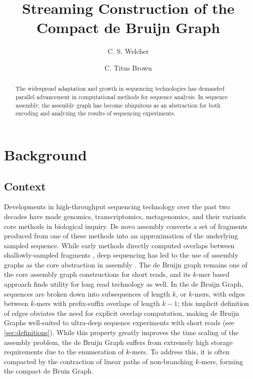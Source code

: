 \documentclass[preprint,number,12pt]{elsarticle}
\begin{document}
\begin{frontmatter}
\title{Streaming Construction of the Compact de Bruijn Graph}

\author[ggcs]{C. S. Welcher}

\author[pop,ggcs]{C. Titus Brown}

\address[ggcs]{Graduate Group for Computer Science, University of California, Davis}
\address[pop]{Department of Population Health and Reproduction, School of Veterinary Medicine, University of California, Davis}

\begin{abstract}
The widespread adaptation and growth in sequencing technologies has demanded parallel advancement in  computational methods for sequence analysis. In sequence assembly, the assembly graph has become ubiquitous as an abstraction for both encoding and analyzing the results of sequencing experiments.
\end{abstract}

\end{frontmatter}


\linenumbers
\section{Background}

\subsection{Context}\label{sec:context}

Developments in high-throughput sequencing technology over the past two decades have made genomics, transcriptomics, metagenomics, and their variants core methods in biological inquiry.
De novo assembly converts a set of fragments produced from one of these methods into an approximation of the underlying sampled sequence.
While early methods directly computed overlaps between shallowly-sampled fragments \cite{roach_random_1995}, deep sequencing has led to the use of assembly graphs as the core abstraction in assembly \cite{myers_toward_1995,simpson_theory_2015,chikhi2016compacting}.
The de Bruijn graph \cite{myers_fragment_2005,li_exploring_2012,zerbino_velvet:_2008,pevzner2001eulerian} remains one of the core assembly graph constructions for short reads, and its $k$-mer based approach finds utility for long read technology as well.
In the de Bruijn Graph, sequences are broken down into subsequences of length $k$, or $k$-mers, with edges between $k$-mers with prefix-suffix overlaps of length $k-1$; this implicit definition of edges obviates the need for explicit overlap computation, making de Bruijn Graphs well-suited to ultra-deep sequence experiments with short reads (see \ref{sec:definitions}).
While this property greatly improves the time scaling of the assembly problem, the de Bruijn Graph suffers from extremely high storage requirements due to the enumeration of $k$-mers.
To address this, it is often compacted by the contraction of linear paths of non-branching $k$-mers, forming the compact de Bruin Graph.
\end{document}
